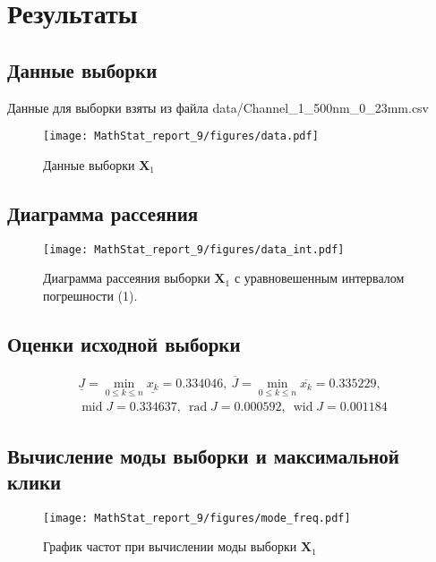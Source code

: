 \documentclass[12pt]{article}
\DeclareMathOperator{\rad}{rad}
\DeclareMathOperator{\wid}{wid}
\DeclareMathOperator{\midd}{mid}
\begin{document}
	\section{Результаты}
	
	\subsection{Данные выборки}
	
	Данные для выборки взяты из файла data/Channel\_1\_500nm\_0\_23mm.csv
	\begin{figure}[H]
		\centering\texttt{[image: MathStat\_report\_9/figures/data.pdf]}
		\caption{Данные выборки $\mathbf{X}_1$}
	\end{figure}
	
	\subsection{Диаграмма рассеяния}
	
	\begin{figure}[H]
		\centering\texttt{[image: MathStat\_report\_9/figures/data\_int.pdf]}
		\caption{Диаграмма рассеяния выборки $\mathbf{X}_1$ с уравновешенным интервалом погрешности (1).}
	\end{figure}
	
	\subsection{Оценки исходной выборки}
	
	\begin{equation*}
		\begin{gathered}
			\underline{J} = \min\limits_{0\leq k\leq n}\underline{x_k} = 0.334046,\ 
			\overline{J} = \min\limits_{0\leq k\leq n}\overline{x_k} = 0.335229,\\
			\midd J = 0.334637,\ \rad J = 0.000592,\ \wid J = 0.001184
		\end{gathered}
	\end{equation*}
	
	\subsection{Вычисление моды выборки и максимальной клики}
	
	\begin{figure}[H]
		\centering\texttt{[image: MathStat\_report\_9/figures/mode\_freq.pdf]}
		\caption{График частот при вычислении моды выборки $\mathbf{X}_1$}
	\end{figure}
	
\end{document}
